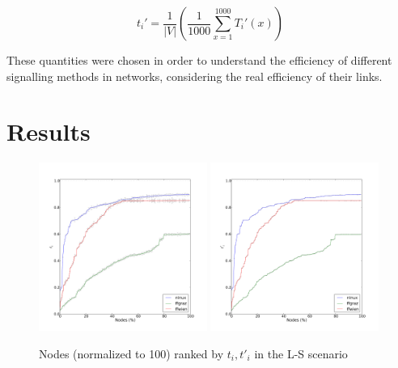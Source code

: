 \documentclass[a4paper,11pt,twoside,openleft]{memoir}
\begin{document}
\begin{equation}
t_i' = \frac{1}{|V|}
       \left( \frac{1}{1000} \sum_{x=1}^{1000} T_i'(x) \right)
\end{equation}

These quantities were chosen in order to understand the efficiency of
different signalling methods in networks, considering the real
efficiency of their links.

\section{Results}\label{signalling-results}

\begin{figure}[htb]
  \centering
  \hspace*{\fill}
  \includegraphics[width=0.49\textwidth]{graphs/all-batman-Tc}
  \hfill
  \includegraphics[width=0.49\textwidth]{graphs/all-batman-Rc}
  \hspace*{\fill}
  \caption{Nodes (normalized to 100) ranked by $t_i, t'_i$ in the L-S scenario}
  \label{fig:mp_ls}
\end{figure}
\end{document}
